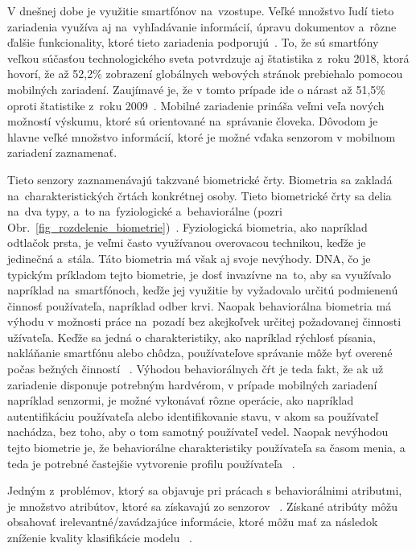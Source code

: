 \documentclass[runningheads]{llncs}
\begin{document}
V dnešnej dobe je využitie smartfónov na~vzostupe. 
Veľké množstvo ľudí tieto zariadenia využíva aj na~vyhľadávanie informácií, 
úpravu dokumentov a~rôzne ďalšie funkcionality, 
ktoré tieto zariadenia podporujú~\cite{ref_bomhold}. 
To, že sú smartfóny veľkou súčasťou technologického sveta potvrdzuje aj 
štatistika z~roku 2018, ktorá hovorí, že až 52,2\% 
zobrazení globálnych webových stránok prebiehalo pomocou mobilných zariadení. 
Zaujímavé je, že v tomto prípade ide o nárast až 51,5\% 
oproti štatistike z~roku 2009~\cite{ref_statista19}. Mobilné zariadenie
prináša veľmi veľa nových možností výskumu, ktoré sú orientované na~správanie človeka.
Dôvodom je hlavne veľké množstvo informácií, ktoré je možné vďaka senzorom v mobilnom 
zariadení zaznamenať. 

Tieto senzory zaznamenávajú takzvané biometrické črty.  
Biometria sa zakladá na~charakteristických črtách konkrétnej osoby. Tieto biometrické 
črty sa delia na~dva typy, a~to na~fyziologické a~behaviorálne 
(pozri Obr.~\ref{fig_rozdelenie_biometrie})~\cite{ref_teh}. Fyziologická biometria, 
ako napríklad odtlačok prsta, je veľmi často využívanou overovacou technikou, 
keďže je jedinečná a~stála. Táto biometria má však aj svoje nevýhody. 
DNA, čo je typickým príkladom tejto biometrie, je dosť invazívne na~to, 
aby sa využívalo napríklad na~smartfónoch, keďže jej využitie by 
vyžadovalo určitú podmienenú činnosť používateľa, napríklad odber krvi. 
Naopak behaviorálna biometria má výhodu v možnosti práce na~pozadí bez akejkoľvek 
určitej požadovanej činnosti užívateľa. Keďže sa jedná o charakteristiky, 
ako napríklad rýchlosť písania, nakláňanie smartfónu alebo chôdza, 
používateľove správanie môže byť overené počas bežných činností ~\cite{ref_teh}.
Výhodou behaviorálnych čŕt je teda fakt, 
že ak už zariadenie disponuje potrebným hardvérom, 
v prípade mobilných zariadení napríklad senzormi, 
je možné vykonávať rôzne operácie, ako napríklad autentifikáciu používateľa alebo 
identifikovanie stavu, v akom sa používateľ nachádza, bez toho, aby o 
tom samotný používateľ vedel. Naopak nevýhodou tejto biometrie je, 
že behaviorálne charakteristiky používateľa sa časom menia, 
a teda je potrebné častejšie vytvorenie profilu používateľa ~\cite{ref_seyd}. 

Jedným z~problémov, ktorý sa objavuje pri prácach s behaviorálnimi atributmi, 
je množstvo atribútov, ktoré sa získavajú zo senzorov ~\cite{ref_nascimento}. 
Získané atribúty môžu obsahovať irelevantné/zavádzajúce informácie, ktoré
môžu mať za následok zníženie kvality klasifikácie modelu
~\cite{ref_babatunde,ref_lu,ref_nascimento,ref_smith,ref_zhao}. 
\end{document}
